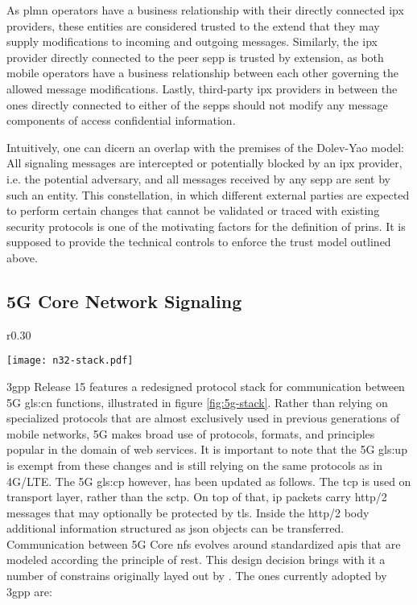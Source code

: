 As \gls{plmn} operators have a business relationship with their directly connected \gls{ipx} providers, these entities are considered trusted to the extend that they may supply modifications to incoming and outgoing messages.
Similarly, the \gls{ipx} provider directly connected to the peer \gls{sepp} is trusted by extension, as both mobile operators have a business relationship between each other governing the allowed message modifications.
Lastly, third-party \gls{ipx} providers in between the ones directly connected to either of the \glspl{sepp} should not modify any message components of access confidential information.

Intuitively, one can dicern an overlap with the premises of the Dolev-Yao model:
All signaling messages are intercepted or potentially blocked by an \gls{ipx} provider, i.e. the potential adversary, and all messages received by any \gls{sepp} are sent by such an entity.
This constellation, in which different external parties are expected to perform certain changes that cannot be validated or traced with existing security protocols is one of the motivating factors for the definition of \gls{prins}.
It is supposed to provide the technical controls to enforce the trust model outlined above.

\subsection{5G Core Network Signaling}

\begin{wrapfigure}{r}{0.30\textwidth}
    \begin{center}
    \texttt{[image: n32-stack.pdf]}
    \end{center}
    \caption{5G control plane stack, according to TS 29.573 (\cite{3gpp.29.573}, p.~11)}
    \label{fig:5g-stack}
\end{wrapfigure}

\gls{3gpp} Release 15 features a redesigned protocol stack for communication between 5G \gls{gls:cn} functions, illustrated in figure \ref{fig:5g-stack}.
Rather than relying on specialized protocols that are almost exclusively used in previous generations of mobile networks, 5G makes broad use of protocols, formats, and principles popular in the domain of web services.
It is important to note that the 5G \gls{gls:up} is exempt from these changes and is still relying on the same protocols as in 4G/LTE.
The 5G \gls{gls:cp} however, has been updated as follows.
The \gls{tcp} is used on transport layer, rather than the \gls{sctp}.
On top of that, \gls{ip} packets carry \gls{http}/2 messages that may optionally be protected by \gls{tls}.
Inside the \gls{http}/2 body additional information structured as \gls{json} objects can be transferred.
Communication between 5G Core \glspl{nf} evolves around standardized \glspl{api} that are modeled according the principle of \gls{rest}.
This design decision brings with it a number of constrains originally layed out by \cite{fielding2000arch}.
The ones currently adopted by \gls{3gpp} are:

